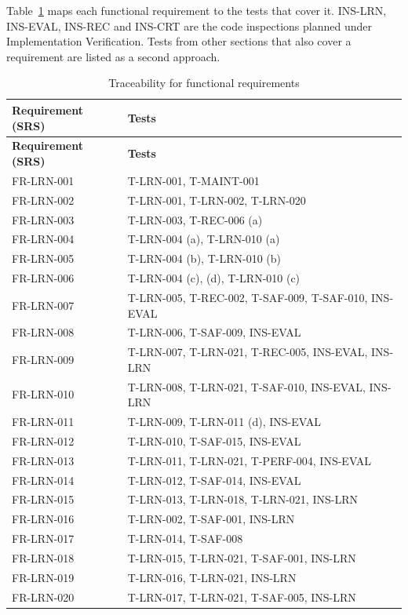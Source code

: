 \documentclass[12pt, titlepage]{article}
\begin{document}
Table~\ref{tab:trace-fr} maps each functional requirement to the tests that
cover it. INS-LRN, INS-EVAL, INS-REC and INS-CRT are the code inspections
planned under Implementation Verification. Tests from other sections that
also cover a requirement are listed as a second approach.

{\small
\begin{longtable}{@{}>{\raggedright\arraybackslash}p{}%
>{\raggedright\arraybackslash}p{}@{}}
\caption{Traceability for functional requirements}
\label{tab:trace-fr}\\
\toprule
\textbf{Requirement (SRS)} & \textbf{Tests}\\
\midrule
\endfirsthead
\toprule
\textbf{Requirement (SRS)} & \textbf{Tests}\\
\midrule
\endhead
FR-LRN-001 & T-LRN-001, T-MAINT-001\\
FR-LRN-002 & T-LRN-001, T-LRN-002, T-LRN-020\\
FR-LRN-003 & T-LRN-003, T-REC-006 (a)\\
FR-LRN-004 & T-LRN-004 (a), T-LRN-010 (a)\\
FR-LRN-005 & T-LRN-004 (b), T-LRN-010 (b)\\
FR-LRN-006 & T-LRN-004 (c), (d), T-LRN-010 (c)\\
FR-LRN-007 & T-LRN-005, T-REC-002, T-SAF-009, T-SAF-010, INS-EVAL\\
FR-LRN-008 & T-LRN-006, T-SAF-009, INS-EVAL\\
FR-LRN-009 & T-LRN-007, T-LRN-021, T-REC-005, INS-EVAL, INS-LRN\\
FR-LRN-010 & T-LRN-008, T-LRN-021, T-SAF-010, INS-EVAL, INS-LRN\\
FR-LRN-011 & T-LRN-009, T-LRN-011 (d), INS-EVAL\\
FR-LRN-012 & T-LRN-010, T-SAF-015, INS-EVAL\\
FR-LRN-013 & T-LRN-011, T-LRN-021, T-PERF-004, INS-EVAL\\
FR-LRN-014 & T-LRN-012, T-SAF-014, INS-EVAL\\
FR-LRN-015 & T-LRN-013, T-LRN-018, T-LRN-021, INS-LRN\\
FR-LRN-016 & T-LRN-002, T-SAF-001, INS-LRN\\
FR-LRN-017 & T-LRN-014, T-SAF-008\\
FR-LRN-018 & T-LRN-015, T-LRN-021, T-SAF-001, INS-LRN\\
FR-LRN-019 & T-LRN-016, T-LRN-021, INS-LRN\\
FR-LRN-020 & T-LRN-017, T-LRN-021, T-SAF-005, INS-LRN\\

\end{longtable}}
\end{document}
